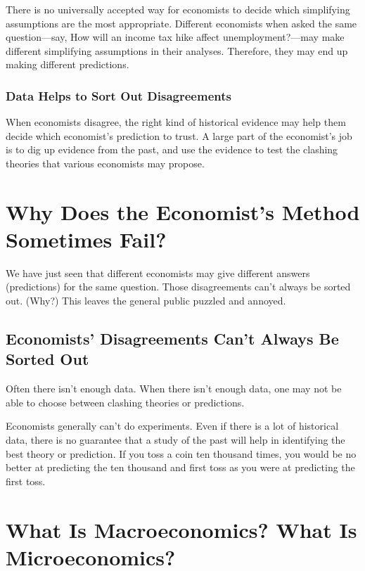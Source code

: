 \documentclass[
  letterpaper,
]{book}
\begin{document}
There is no universally accepted way for economists to decide which
simplifying assumptions are the most appropriate. Different economists
when asked the same question---say, How will an income tax hike affect
unemployment?---may make different simplifying assumptions in their
analyses. Therefore, they may end up making different predictions.

\subsubsection{Data Helps to Sort Out
Disagreements}\label{data-helps-to-sort-out-disagreements}

When economists disagree, the right kind of historical evidence may help
them decide which economist's prediction to trust. A large part of the
economist's job is to dig up evidence from the past, and use the
evidence to test the clashing theories that various economists may
propose.

\section{Why Does the Economist's Method Sometimes
Fail?}\label{why-does-the-economists-method-sometimes-fail}

We have just seen that different economists may give different answers
(predictions) for the same question. Those disagreements can't always be
sorted out. (Why?) This leaves the general public puzzled and annoyed.

\subsection{Economists' Disagreements Can't Always Be Sorted
Out}\label{economists-disagreements-cant-always-be-sorted-out}

Often there isn't enough data. When there isn't enough data, one may not
be able to choose between clashing theories or predictions.

Economists generally can't do experiments. Even if there is a lot of
historical data, there is no guarantee that a study of the past will
help in identifying the best theory or prediction. If you toss a coin
ten thousand times, you would be no better at predicting the ten
thousand and first toss as you were at predicting the first toss.

\section{What Is Macroeconomics? What Is
Microeconomics?}\label{what-is-macroeconomics-what-is-microeconomics}
\end{document}
